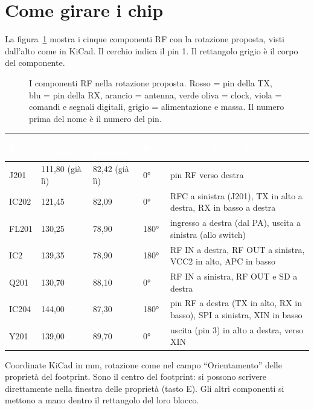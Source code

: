\documentclass[a4paper,11pt]{article}
\newcommand{\tabhead}{\rowcolor{sbblue}}
\newcommand{\hd}[1]{\textcolor{white}{\sffamily\bfseries\footnotesize #1}}
\begin{document}
\section{Come girare i chip}
La figura~\ref{fig:pinout} mostra i cinque componenti RF con la rotazione proposta, visti dall'alto come in KiCad. Il cerchio indica il pin 1. Il rettangolo grigio è il corpo del componente.

\begin{figure}[H]
\centering

\caption{I componenti RF nella rotazione proposta. Rosso = pin della TX, blu = pin della RX, arancio = antenna, verde oliva = clock, viola = comandi e segnali digitali, grigio = alimentazione e massa. Il numero prima del nome è il numero del pin.}
\label{fig:pinout}
\end{figure}

{\small
{}
\begin{xltabular}{\linewidth}{@{}L{17mm}L{22mm}L{22mm}L{15mm}Y@{}}
\tabhead\hd{Rif.}&\hd{X proposta}&\hd{Y proposta}&\hd{Rot.}&\hd{Che cosa guarda dove}\\
\endhead
J201 & 111,80 (già lì) & 82,42 (già lì) & \ang{0} & pin RF verso destra\\
IC202 & 121,45 & 82,09 & \ang{0} & RFC a sinistra (J201), TX in alto a destra, RX in basso a destra\\
FL201 & 130,25 & 78,90 & \ang{180} & ingresso a destra (dal PA), uscita a sinistra (allo switch)\\
IC2 & 139,35 & 78,90 & \ang{180} & RF IN a destra, RF OUT a sinistra, VCC2 in alto, APC in basso\\
Q201 & 130,70 & 88,10 & \ang{0} & RF IN a sinistra, RF OUT e SD a destra\\
IC204 & 144,00 & 87,30 & \ang{180} & pin RF a destra (TX in alto, RX in basso), SPI a sinistra, XIN in basso\\
Y201 & 139,00 & 89,70 & \ang{0} & uscita (pin 3) in alto a destra, verso XIN\\
\bottomrule
\end{xltabular}}
{\footnotesize Coordinate KiCad in mm, rotazione come nel campo \enquote{Orientamento} delle proprietà del footprint. Sono il centro del footprint: si possono scrivere direttamente nella finestra delle proprietà (tasto E). Gli altri componenti si mettono a mano dentro il rettangolo del loro blocco.}

\end{document}
